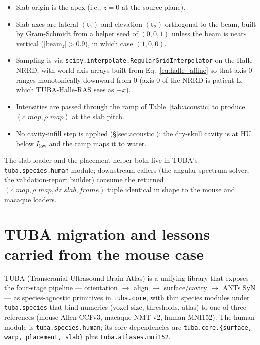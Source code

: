 \documentclass{compactarticle}
\begin{document}
\begin{itemize}
\item Slab origin is the apex (i.e., $z=0$ at the source plane).
\item Slab axes are lateral $(\mathbf{t}_1)$ and elevation $(\mathbf{t}_2)$
  orthogonal to the beam, built by Gram-Schmidt from a helper seed of
  $(0,0,1)$ unless the beam is near-vertical
  ($|\mathrm{beam}_z| > 0.9$), in which case $(1,0,0)$.
\item Sampling is via
  \texttt{scipy.interpolate.RegularGridInterpolator} on the Halle NRRD,
  with world-axis arrays built from Eq.~\ref{eq:halle_affine} so that
  axis 0 ranges monotonically downward from $0$ (axis 0 of the NRRD is
  patient-L, which TUBA-Halle-RAS sees as $-x$).
\item Intensities are passed through the ramp of
  Table~\ref{tab:acoustic} to produce $(c\_map, \rho\_map)$ at the slab
  pitch.
\item No cavity-infill step is applied (\S\ref{sec:acoustic}): the
  dry-skull cavity is at HU below $I_\mathrm{low}$ and the ramp maps it
  to water.
\end{itemize}

The slab loader and the placement helper both live in TUBA's
\texttt{tuba.species.human} module; downstream callers (the
angular-spectrum solver, the validation-report builder) consume the
returned $(c\_map, \rho\_map, dz\_slab, frame)$ tuple identical in
shape to the mouse and macaque loaders.

\section{TUBA migration and lessons carried from the mouse case}
\label{sec:tuba}
TUBA (Transcranial Ultrasound Brain Atlas) is a unifying library that
exposes the four-stage pipeline --- orientation $\rightarrow$ align
$\rightarrow$ surface/cavity $\rightarrow$ ANTs SyN --- as
species-agnostic primitives in \texttt{tuba.core}, with thin species
modules under \texttt{tuba.species} that bind numerics (voxel size,
thresholds, atlas) to one of three references (mouse Allen CCFv3,
macaque NMT v2, human MNI152). The human module is
\texttt{tuba.species.human}; its core dependencies are
\texttt{tuba.core.\{surface, warp, placement, slab\}} plus
\texttt{tuba.atlases.mni152}.
\end{document}
